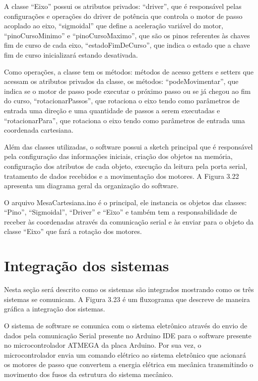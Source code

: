 A classe “Eixo” possui os atributos privados: “driver”, que é responsável pelas configurações e operações do driver 
de potência que controla o motor de passo acoplado ao eixo, “sigmoidal” que define a aceleração variável do motor, 
“pinoCursoMinimo” e “pinoCursoMaximo”, que são os pinos referentes às chaves fim de curso de cada eixo, 
“estadoFimDeCurso”, que indica o estado que a chave fim de curso inicializará estando desativada. 

Como operações, a classe tem os métodos: métodos de acesso getters e setters que acessam os atributos privados 
da classe, os métodos: “podeMovimentar”, que indica se o motor de passo pode executar o próximo passo ou se já 
chegou ao fim do curso, “rotacionarPassos”, que rotaciona o eixo tendo como parâmetros de entrada uma direção 
e uma quantidade de passos a serem executadas e “rotacionarPara”, que rotaciona o eixo tendo como parâmetros 
de entrada uma coordenada cartesiana.

Além das classes utilizadas, o software possui a sketch principal que é responsável pela configuração das 
informações iniciais, criação dos objetos na memória, configuração dos atributos de cada objeto, execução 
da leitura pela porta serial, tratamento de dados recebidos e a movimentação dos motores.
A Figura 3.22 apresenta um diagrama geral da organização do software.


O arquivo MesaCartesiana.ino é o principal, ele instancia os objetos das classes: “Pino”, “Sigmoidal”, 
“Driver” e “Eixo” e também tem a responsabilidade de receber às coordenadas através da comunicação serial 
e às enviar para o objeto da classe “Eixo” que fará a rotação dos motores.

\section{Integração dos sistemas}

Nesta seção será descrito como os sistemas são integrados mostrando como os três sistemas se comunicam. 
A Figura 3.23 é um fluxograma que descreve de maneira gráfica a integração dos sistemas.


O sistema de software se comunica com o sistema eletrônico através do envio de dados pela comunicação Serial 
presente no Arduino IDE para o software presente no microcontrolador ATMEGA da placa Arduino. Por sua vez, 
o microcontrolador envia um comando elétrico ao sistema eletrônico que acionará os motores de passo que convertem 
a energia elétrica em mecânica transmitindo o movimento dos fusos da estrutura do sistema mecânico.












